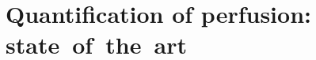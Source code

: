 \cleardoublepage
\part{Quantification of perfusion: state~of~the~art}\label{part:part1}




\newpage

